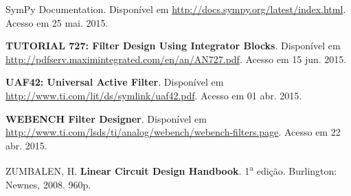 \begin{thebibliography}{99}
 SymPy Documentation. Disponível em \url{http://docs.sympy.org/latest/index.html}. Acesso em 25 mai. 2015.

 \textbf{TUTORIAL 727: Filter Design Using Integrator Blocks}. Disponível em \url{http://pdfserv.maximintegrated.com/en/an/AN727.pdf}. Acesso em 15 jun. 2015.



 \textbf{UAF42: Universal Active Filter}. Disponível em \url{http://www.ti.com/lit/ds/symlink/uaf42.pdf}. Acesso em 01 abr. 2015.

 \textbf{WEBENCH Filter Designer}. Disponível em \url{http://www.ti.com/lsds/ti/analog/webench/webench-filters.page}. Acesso em 22 abr. 2015.

 ZUMBALEN, H. \textbf{Linear Circuit Design Handbook}. 1\textsuperscript{a} edição. Burlington: Newnes, 2008. 960p. %
\end{thebibliography}